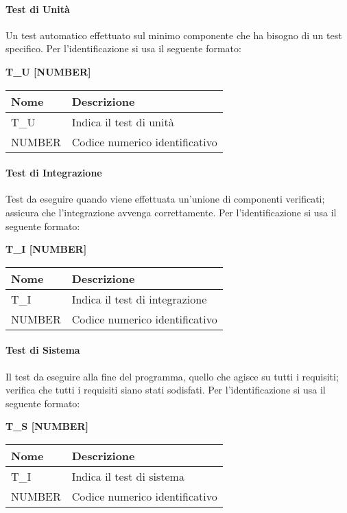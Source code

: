 \paragraph{Test di Unità} \hfill \break
Un test automatico effettuato sul minimo componente che ha bisogno di un test specifico.\newline
Per l’identificazione si usa il seguente formato:
\begin{center}
    \textbf{T\_U [NUMBER]}
\end{center}
\renewcommand{\arraystretch}{1.8} 
 \begin{tabular}{ |m{7em}|m{30em}| }
        \hline 
        \textbf{Nome} & \textbf{Descrizione} \\
        \hline
            T\_U & Indica il test di unità \\
        \hline
            NUMBER & Codice numerico identificativo \\
        \hline
 \end{tabular}

\paragraph{Test di Integrazione}  \hfill \break
Test da eseguire quando viene effettuata un'unione di componenti verificati; assicura che l’integrazione 
avvenga correttamente.
Per l’identificazione si usa il seguente formato:
\begin{center}
    \textbf{T\_I [NUMBER]}
\end{center}
\renewcommand{\arraystretch}{1.8} 
 \begin{tabular}{ |m{7em}|m{30em}| }
        \hline
        \textbf{Nome} & \textbf{Descrizione} \\
        \hline
            T\_I & Indica il test di integrazione \\
        \hline
            NUMBER & Codice numerico identificativo \\
        \hline
 \end{tabular}

\paragraph{Test di Sistema}  \hfill \break
Il test da eseguire alla fine del programma, quello che agisce su tutti i requisiti; verifica che tutti i 
requisiti siano stati sodisfati.
Per l’identificazione si usa il seguente formato:
\begin{center}
    \textbf{T\_S [NUMBER]}
\end{center}
\renewcommand{\arraystretch}{1.8} 
 \begin{tabular}{ |m{7em}|m{30em}| }
        \hline
        \textbf{Nome} & \textbf{Descrizione} \\
        \hline
            T\_I & Indica il test di sistema \\
        \hline
            NUMBER & Codice numerico identificativo \\
        \hline
 \end{tabular}

